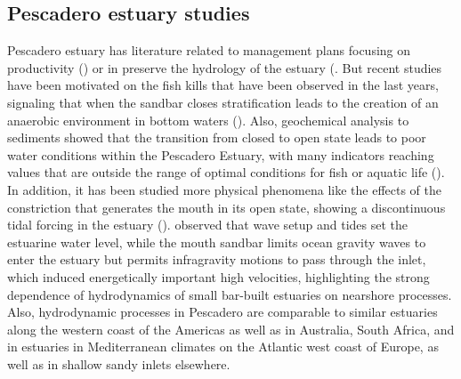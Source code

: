 \documentclass[11pt,letterpaper]{article}
\begin{document}
\subsection{Pescadero estuary studies}

Pescadero estuary has literature related to management plans focusing on productivity (\cite{curry1985pescadero}) or in preserve the hydrology of the estuary (\cite{williams1990pescadero}. But recent studies have been motivated on the fish kills that have been observed in the last years, signaling that when the sandbar closes stratification leads to the creation of an anaerobic environment in bottom waters (\cite{sloan2006ecological}). Also, geochemical analysis to sediments showed that the transition from closed to open state leads to poor water conditions within the Pescadero Estuary, with many indicators reaching values that are outside the range of optimal conditions for fish or aquatic life (\cite{richards2018}). \\

In addition, it has been studied more physical phenomena like the effects of the constriction that generates the mouth in its open state, showing a discontinuous tidal forcing in the estuary (\cite{williams2016}). \citeauthor{williams2016} observed that wave setup and tides set the estuarine water level, while the mouth sandbar limits ocean gravity waves to enter the estuary but permits infragravity motions to pass through the inlet, which induced energetically important high velocities, highlighting the strong dependence of hydrodynamics of small bar-built estuaries on nearshore processes. Also, hydrodynamic processes in Pescadero are comparable to similar estuaries along the western coast of the Americas as well as in Australia, South Africa, and in estuaries in Mediterranean climates on the Atlantic west coast of Europe, as well as in shallow sandy inlets elsewhere.\\




\end{document}
